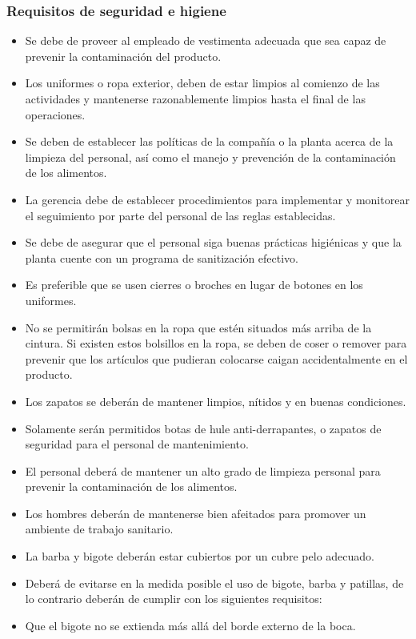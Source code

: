 \subsubsection{Requisitos de seguridad e higiene}
\begin{itemize}
	\item Se debe de proveer al empleado de vestimenta adecuada que sea capaz de prevenir la contaminación del producto.
	\item Los uniformes o ropa exterior, deben de estar limpios al comienzo de las actividades y mantenerse razonablemente limpios hasta el final de las operaciones.
	\item Se deben de establecer las políticas de la compañía o la planta acerca de la limpieza del personal, así como el manejo y prevención de la contaminación de los alimentos.
	\item La gerencia debe de establecer procedimientos para implementar y monitorear el seguimiento por parte del personal de las reglas establecidas.
	\item Se debe de asegurar que el personal siga buenas prácticas higiénicas y que la planta cuente con un programa de sanitización efectivo.
	\item Es preferible que se usen cierres o broches en lugar de botones en los uniformes.
	\item No se permitirán bolsas en la ropa que estén situados más arriba de la cintura. Si existen estos bolsillos en la ropa, se deben de coser o remover para prevenir que los artículos que pudieran colocarse caigan accidentalmente en el producto.
	\item Los zapatos se deberán de mantener limpios, nítidos y en buenas condiciones.
	\item Solamente serán permitidos botas de hule anti-derrapantes, o zapatos de seguridad para el personal de mantenimiento.
	\item El personal deberá de mantener un alto grado de limpieza personal para prevenir la contaminación de los alimentos.
	\item Los hombres deberán de mantenerse bien afeitados para promover un ambiente de trabajo sanitario.
	\item La barba y bigote deberán estar cubiertos por un cubre pelo adecuado.
	\item Deberá de evitarse en la medida posible el uso de bigote, barba y patillas, de lo contrario deberán de cumplir con los siguientes requisitos:
	\item Que el bigote no se extienda más allá del borde externo de la boca.

\end{itemize}
